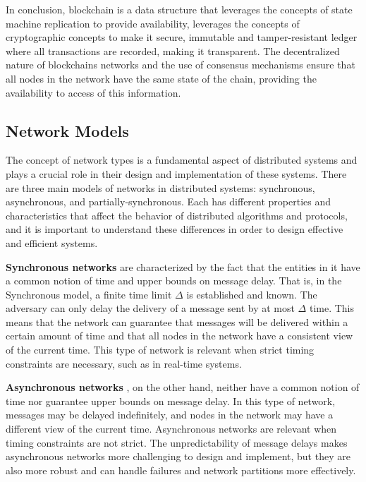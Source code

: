In conclusion, blockchain is a data structure that leverages the concepts of state machine replication to provide availability, leverages the concepts of cryptographic concepts to make it secure, immutable and tamper-resistant ledger where all transactions are recorded, making it transparent.
The decentralized nature of blockchains networks and the use of consensus mechanisms ensure that all nodes in the network have the same state of the chain, providing the availability to access of this information.

\subsection*{\textbf{Network Models}}

The concept of network types is a fundamental aspect of distributed systems and plays a crucial role in their design and implementation of these systems. There are three main models of networks in distributed systems: synchronous, asynchronous, and partially-synchronous. Each has different properties and characteristics that affect the behavior of distributed algorithms and protocols, and it is important to understand these differences in order to design effective and efficient systems.

\textbf{Synchronous networks} are characterized by the fact that the entities in it have a common notion of time and upper bounds on message delay. 
That is, in the Synchronous model, a finite time limit $\Delta$ is established and known. 
The adversary can only delay the delivery of a message sent by at most $\Delta$ time.
This means that the network can guarantee that messages will be delivered within a certain amount of time and that all nodes in the network have a consistent view of the current time. This type of network is relevant when strict timing constraints are necessary, such as in real-time systems.

\textbf{Asynchronous networks} \cite{bracha1985asynchronous}, on the other hand, neither have a common notion of time nor guarantee upper bounds on message delay. 
In this type of network, messages may be delayed indefinitely, and nodes in the network may have a different view of the current time. Asynchronous networks are relevant when timing constraints are not strict. The unpredictability of message delays makes asynchronous networks more challenging to design and implement, but they are also more robust and can handle failures and network partitions more effectively.

